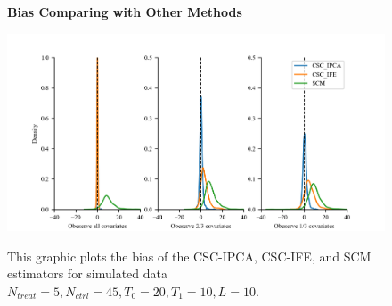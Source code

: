 \documentclass[12pt]{article}
\begin{document}
\begin{figure}[!ht]
\centering
\caption{\textbf{Bias Comparing with Other Methods}}
\includegraphics{figs/bias_compar1.png}
\label{fig: bias}
\caption*{\footnotesize{This graphic plots the bias of the CSC-IPCA, CSC-IFE, and SCM estimators for simulated data $N_{treat} = 5, N_{ctrl} = 45, T_0=20, T_1=10, L=10$.}}
\end{figure}
\end{document}
